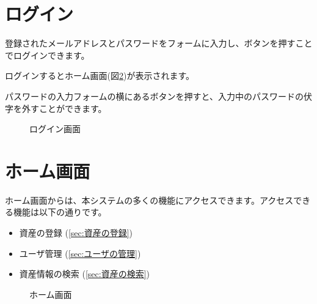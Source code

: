 \documentclass[11ptm]{jsarticle}
\begin{document}
\section{ログイン}
\label{sec:ログイン}
登録されたメールアドレスとパスワードをフォームに入力し、ボタンを押すことでログインできます。\par
ログインするとホーム画面(図\ref{fig:ホーム画面})が表示されます。\par
パスワードの入力フォームの横にあるボタンを押すと、入力中のパスワードの伏字を外すことができます。
\begin{figure}[h]
  \centering
  \caption{\label{fig:ログイン画面}ログイン画面}
\end{figure}


\section{ホーム画面}
\label{sec:ホーム画面}
ホーム画面からは、本システムの多くの機能にアクセスできます。アクセスできる機能は以下の通りです。
\begin{itemize}
  \item 資産の登録 (\!\ref{sec:資産の登録})
  \item ユーザ管理 (\!\ref{sec:ユーザの管理})
  \item 資産情報の検索 (\!\ref{sec:資産の検索})
\end{itemize}\par
\begin{figure}[h]
  \centering
  \caption{\label{fig:ホーム画面}ホーム画面}
\end{figure}
\end{document}
